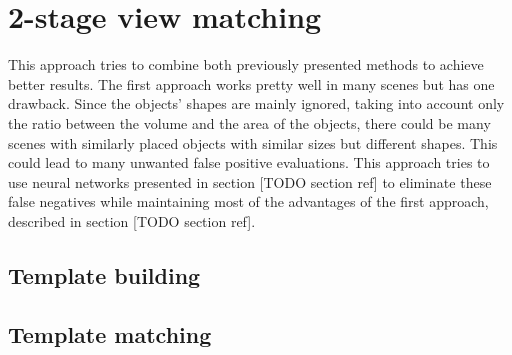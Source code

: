 \section{2-stage view matching}

This approach tries to combine both previously presented methods to achieve better results. The first approach works pretty well in many scenes but has one drawback. Since the objects' shapes are mainly ignored, taking into account only the ratio between the volume and the area of the objects, there could be many scenes with similarly placed objects with similar sizes but different shapes. This could lead to many unwanted false positive evaluations. This approach tries to use neural networks presented in section [TODO section ref] to eliminate these false negatives while maintaining most of the advantages of the first approach, described in section [TODO section ref].\par

\subsection{Template building}



\subsection{Template matching}


